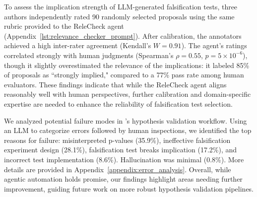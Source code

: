 \vspace{-0.5em}

To assess the implication strength of LLM-generated falsification tests, three authors independently rated 90 randomly selected proposals using the same rubric provided to the ReleCheck agent (Appendix~\ref{lst:relevance_checker_prompt}). 
After calibration, the annotators achieved a high inter-rater agreement (Kendall's $W=0.91$). 
The agent's ratings correlated strongly with human judgments (Spearman's $\rho=0.55$, $p=5\times10^{-6}$), 
though it slightly overestimated the relevance of the implications: 
it labeled 85\% of proposals as ``strongly implied," compared to a 77\% pass rate among human evaluators. 
These findings indicate that while the ReleCheck agent aligns reasonably well with human perspectives, further calibration and domain-specific expertise are needed to enhance the reliability of falsification test selection.

\vspace{-0.5em}
We analyzed potential failure modes in \mname's hypothesis validation workflow. Using an LLM to categorize errors followed by human inspections, we identified the top reasons for failure: misinterpreted p-values (35.9\%), ineffective falsification experiment design (28.1\%), falsification test breaks implication (17.2\%), and incorrect test implementation (8.6\%). Hallucination was minimal (0.8\%). More details are provided in Appendix~\ref{appendix:error_analysis}. Overall, while agentic automation holds promise, our findings highlight areas needing further improvement, guiding future work on more robust hypothesis validation pipelines.
















